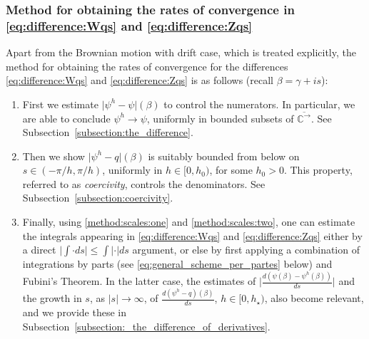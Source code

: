 \documentclass[pdftex,oneside,11pt,reqno]{amsart}
\theoremstyle{definition}
\theoremstyle{theorem}
\theoremstyle{remark}
\numberwithin{equation}{section}
\numberwithin{definition}{section}
\begin{document}
\subsubsection{Method for obtaining the rates of convergence in \eqref{eq:difference:Wqs} and \eqref{eq:difference:Zqs}}\label{subsubsection:method_for_obtaining_the_rates_of_convergence}
Apart from the Brownian motion with drift case, which is treated explicitly, the method for obtaining the rates of convergence for the differences \eqref{eq:difference:Wqs} and \eqref{eq:difference:Zqs} is as follows (recall $\beta=\gamma+is$):
\begin{enumerate}
\item \label{method:scales:one}First we estimate $\vert \psi^h-\psi\vert (\beta)$ to control the numerators. In particular, we are able to conclude $\psi^h\to\psi$, uniformly in bounded subsets of ${\overline{\mathbb{C}^{\rightarrow}}}$. See Subsection~\ref{subsection:the_difference}.
\item \label{method:scales:two} Then we show $\vert\psi ^h-q\vert(\beta)$ is suitably bounded from below on $s\in (-\pi/h,\pi/h)$, uniformly in $h\in [0, h_0)$, for some $h_0>0$. This property, referred to as \emph{coercivity}, controls the denominators. See Subsection~\ref{subsection:coercivity}.
 \item \label{method:scales:three} Finally, using \eqref{method:scales:one} and \eqref{method:scales:two}, one can estimate the integrals appearing in \eqref{eq:difference:Wqs} and \eqref{eq:difference:Zqs} either by a direct $\vert\int\cdot ds\vert\leq \int\vert\cdot\vert ds$ argument, or else by first applying a combination of integrations by parts (see \eqref{eq:general_scheme_per_partes} below) and Fubini's Theorem. In the latter case, the estimates of $\vert \frac{d(\psi(\beta)-\psi^h(\beta))}{ds}\vert$ and the growth in $s$, as $\vert s\vert\to\infty$, of $\frac{d(\psi^h-q)(\beta)}{ds}$, $h\in [0,h_\star)$, also become relevant, and we provide these in Subsection~\ref{subsection:_the_difference_of_derivatives}. 
\end{enumerate}
\end{document}
